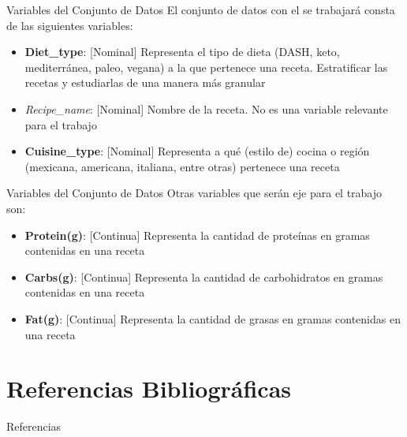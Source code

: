 \documentclass{beamer}
\begin{document}
    \begin{frame}{Variables del Conjunto de Datos}
        El conjunto de datos con el se trabajará consta de 
        las siguientes variables:
        \begin{itemize}
            \item<2->\textbf{Diet\_type}: [Nominal] Representa 
            el tipo de dieta (DASH, keto, mediterránea, paleo, vegana) 
            a la que pertenece una receta. Estratificar las recetas 
            y estudiarlas de una manera más granular
            \item<3->\emph{Recipe\_name}: [Nominal] Nombre de 
            la receta. No es una variable relevante para el trabajo
            \item<4->\textbf{Cuisine\_type}: [Nominal] Representa 
            a qué (estilo de) cocina o región (mexicana, americana, 
            italiana, entre otras) pertenece una receta
        \end{itemize}
    \end{frame}

    \begin{frame}{Variables del Conjunto de Datos}
        Otras variables que serán eje para el trabajo son:
        \begin{itemize}
            \item<1->\textbf{Protein(g)}: [Continua] Representa la 
            cantidad de proteínas en gramas contenidas en una receta
            \item<2->\textbf{Carbs(g)}: [Continua] Representa la 
            cantidad de carbohidratos en gramas contenidas en una receta
            \item<3->\textbf{Fat(g)}: [Continua] Representa la 
            cantidad de grasas en gramas contenidas en una receta
        \end{itemize}
    \end{frame}

    \section{Referencias Bibliográficas}

    \begin{frame}{Referencias}
        \printbibliography
    \end{frame}
\end{document}
